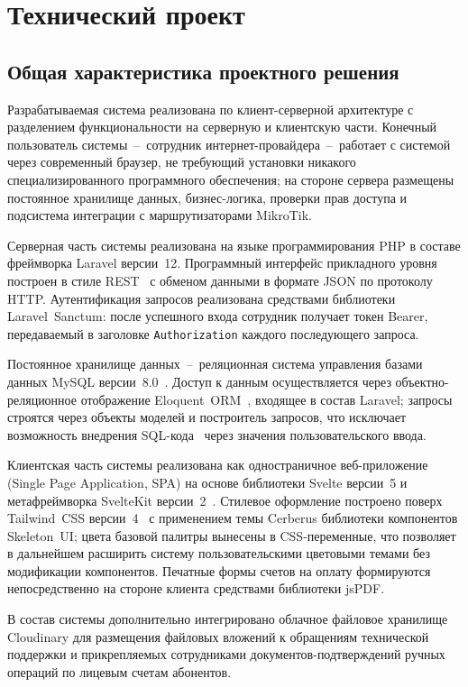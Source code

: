 \section{Технический проект}

\subsection{Общая характеристика проектного решения}

Разрабатываемая система реализована по клиент-серверной архитектуре с разделением функциональности на серверную и клиентскую части. Конечный пользователь системы~--~сотрудник интернет-провайдера~--~работает с системой через современный браузер, не требующий установки никакого специализированного программного обеспечения; на стороне сервера размещены постоянное хранилище данных, бизнес-логика, проверки прав доступа и подсистема интеграции с маршрутизаторами MikroTik.

Серверная часть системы реализована на языке программирования PHP в составе фреймворка Laravel версии~12. Программный интерфейс прикладного уровня построен в стиле REST~\cite{rfc9110} с обменом данными в формате JSON по протоколу HTTP. Аутентификация запросов реализована средствами библиотеки Laravel~Sanctum: после успешного входа сотрудник получает токен Bearer, передаваемый в заголовке \texttt{Authorization} каждого последующего запроса.

Постоянное хранилище данных~--~реляционная система управления базами данных MySQL версии~8.0~\cite{mysqldoc}. Доступ к данным осуществляется через объектно-реляционное отображение Eloquent~ORM~\cite{romanov}, входящее в состав Laravel; запросы строятся через объекты моделей и построитель запросов, что исключает возможность внедрения SQL-кода~\cite{owasp} через значения пользовательского ввода.

Клиентская часть системы реализована как одностраничное веб-приложение (Single Page Application, SPA) на основе библиотеки Svelte версии~5 и метафреймворка SvelteKit версии~2~\cite{sveltedoc,sveltekitdoc}. Стилевое оформление построено поверх Tailwind~CSS версии~4~\cite{tailwind} с применением темы Cerberus библиотеки компонентов Skeleton~UI; цвета базовой палитры вынесены в CSS-переменные, что позволяет в дальнейшем расширить систему пользовательскими цветовыми темами без модификации компонентов. Печатные формы счетов на оплату формируются непосредственно на стороне клиента средствами библиотеки jsPDF.

В состав системы дополнительно интегрировано облачное файловое хранилище Cloudinary для размещения файловых вложений к обращениям технической поддержки и прикрепляемых сотрудниками документов-подтверждений ручных операций по лицевым счетам абонентов.

